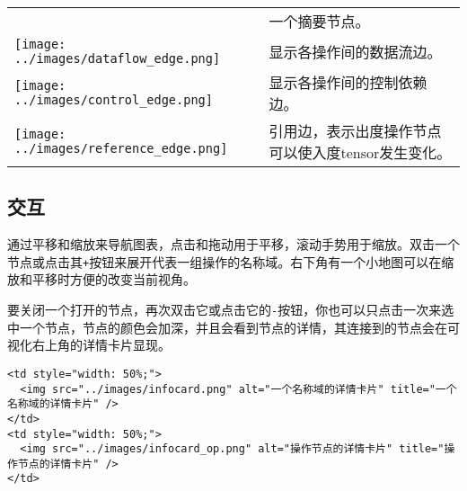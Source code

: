 \begin{longtable}[c]{@{}ll@{}}
\begin{minipage}[t]{0.05\columnwidth}
\strut\end{minipage} &
\begin{minipage}[t]{0.05\columnwidth}\raggedright\strut
一个摘要节点。
\strut\end{minipage}\tabularnewline
\begin{minipage}[t]{0.05\columnwidth}\raggedright\strut
\texttt{[image: ../images/dataflow\_edge.png]}
\strut\end{minipage} &
\begin{minipage}[t]{0.05\columnwidth}\raggedright\strut
显示各操作间的数据流边。
\strut\end{minipage}\tabularnewline
\begin{minipage}[t]{0.05\columnwidth}\raggedright\strut
\texttt{[image: ../images/control\_edge.png]}
\strut\end{minipage} &
\begin{minipage}[t]{0.05\columnwidth}\raggedright\strut
显示各操作间的控制依赖边。
\strut\end{minipage}\tabularnewline
\begin{minipage}[t]{0.05\columnwidth}\raggedright\strut
\texttt{[image: ../images/reference\_edge.png]}
\strut\end{minipage} &
\begin{minipage}[t]{0.05\columnwidth}\raggedright\strut
引用边，表示出度操作节点可以使入度tensor发生变化。
\strut\end{minipage}\tabularnewline
\bottomrule
\end{longtable}

\subsection{交互 }\label{ux4ea4ux4e92}

通过平移和缩放来导航图表，点击和拖动用于平移，滚动手势用于缩放。双击一个节点或点击其\texttt{+}按钮来展开代表一组操作的名称域。右下角有一个小地图可以在缩放和平移时方便的改变当前视角。

要关闭一个打开的节点，再次双击它或点击它的\texttt{-}按钮，你也可以只点击一次来选中一个节点，节点的颜色会加深，并且会看到节点的详情，其连接到的节点会在可视化右上角的详情卡片显现。

\begin{verbatim}
<td style="width: 50%;">
  <img src="../images/infocard.png" alt="一个名称域的详情卡片" title="一个名称域的详情卡片" />
</td>
<td style="width: 50%;">
  <img src="../images/infocard_op.png" alt="操作节点的详情卡片" title="操作节点的详情卡片" />
</td>
\end{verbatim}

